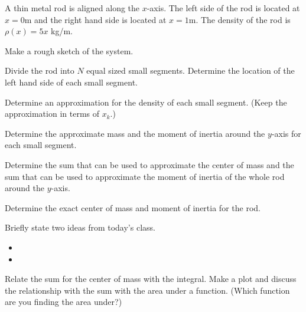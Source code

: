 \begin{problem}
\item A thin metal rod is aligned along the $x$-axis. The left side of
  the rod is located at $x=0$m and the right hand side is located at
  $x=1$m. The density of the rod is $\rho(x)=5x$ kg/m.
  \begin{subproblem}
    \item Make a rough sketch of the system.
      \vfill
    \item Divide the rod into $N$ equal sized small
      segments. Determine the location of the left hand side of each
      small segment.
      \vfill
    \item Determine an approximation for the density of each small
      segment. (Keep the approximation in terms of $x_k$.)
      \vfill
    \item Determine the approximate mass and the moment of inertia
      around the $y$-axis for each small segment.
      \vfill

      \clearpage

    \item Determine the sum that can be used to approximate the center
      of mass and the sum that can be used to approximate the moment
      of inertia of the whole rod around the $y$-axis.

      \vfill

    \item Determine the exact center of mass and moment of inertia for
      the rod.

      \vfill
      \vfill

  \end{subproblem}
\end{problem}

\postClass

\begin{problem}
\item Briefly state two ideas from today's class.
  \begin{itemize}
  \item
  \item
  \end{itemize}
\item Relate the sum for the center of mass with the integral. Make a
  plot and discuss the relationship with the sum with the area under a
  function. (Which function are you finding the area under?)

  \vfill
\end{problem}


